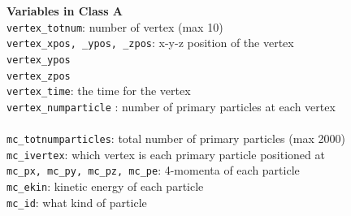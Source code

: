 {\bf Variables in Class A}\\
\nolinkurl{vertex_totnum}:  number of vertex (max 10) \\
\nolinkurl{vertex_xpos, _ypos, _zpos}: x-y-z position of the vertex \\
\nolinkurl{vertex_ypos} \\
\nolinkurl{vertex_zpos} \\
\nolinkurl{vertex_time}: the time for the vertex \\
\nolinkurl{vertex_numparticle} : number of primary particles at each vertex \\
\\
\nolinkurl{mc_totnumparticles}: total number of primary particles (max 2000)\\
\nolinkurl{mc_ivertex}: which vertex is each primary particle positioned at \\
\nolinkurl{mc_px, mc_py, mc_pz, mc_pe}: 4-momenta of each particle \\
\nolinkurl{mc_ekin}: kinetic energy of each particle \\
\nolinkurl{mc_id}: what kind of particle \\



